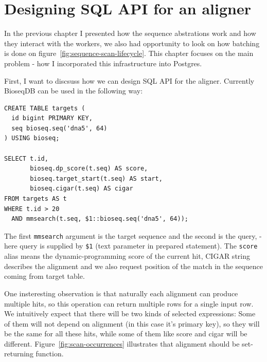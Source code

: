 \section{Designing SQL API for an aligner}
\label{sec:postgres-custom-scan-scope}

In the previous chapter I presented how the sequence abstrations work and how they interact with the workers, we also had opportunity to look on how batching is done on figure~\ref{fig:sequence-scan-lifecycle}.
This chapter focuses on the main problem - how I incorporated this infrastructure into Postgres.

First, I want to discsuss how we can design SQL API for the aligner. Currently BioseqDB can be used in the following way:

\begin{minipage}{\linewidth}
\begin{lstlisting}[style=bioseq-search-sql,caption={Search once and return the fields of each hit.}]
CREATE TABLE targets (
  id bigint PRIMARY KEY,
  seq bioseq.seq('dna5', 64)
) USING bioseq;

SELECT t.id,
       bioseq.dp_score(t.seq) AS score,
       bioseq.target_start(t.seq) AS start,
       bioseq.cigar(t.seq) AS cigar
FROM targets AS t
WHERE t.id > 20
  AND mmsearch(t.seq, $1::bioseq.seq('dna5', 64));
\end{lstlisting}
\end{minipage}

The first \texttt{mmsearch} argument is the target sequence and the second
is the query, - here query is supplied by \texttt{\$1} (text parameter in prepared statement). The
\texttt{score} alias means the dynamic-programming score of the current hit,
CIGAR string describes the alignment and we also request position of the match in the sequence coming from target table.

One insteresting observation is that naturally each alignment can produce multiple hits, so this operation can return multiple rows for a single input row. We intuitively expect that there will be two kinds of selected expressions: Some of them will not depend on alignment (in this case it's primary key), so they will be the same for all these hits, while some of them like score and cigar will be different.
Figure~\ref{fig:scan-occurrences} illustrates that alignment should be set-returning function.

